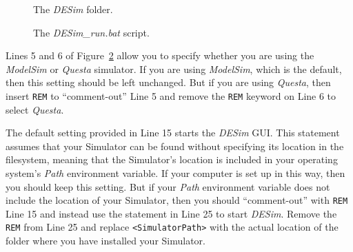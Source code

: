 \documentclass[11pt, twoside, pdftex]{article}
\begin{document}
\begin{figure}[h]
	\begin{center}
        \setlength{\fboxsep}{0pt}
	\end{center}
		  \caption{The {\it DESim} folder.}
	\label{fig:install}
\end{figure}

\begin{figure}[H]
\begin{center}
    \begin{minipage}[t]{16.75 cm}

    \end{minipage}
		  \caption{The {\it DESim\_run.bat} script.}
	\label{fig:bat}
\end{center}
\end{figure}

Lines 5 and 6 of Figure~\ref{fig:bat} allow you to specify whether you are using the
{\it ModelSim} or {\it Questa} simulator. If you are using {\it ModelSim}, which is the
default, then this setting should be left unchanged. But if you are using {\it Questa},
then insert \texttt{REM} to ``comment-out'' Line 5 and remove the \texttt{REM} keyword 
on Line 6 to select {\it Questa}. 

The default setting provided in Line 15 starts the {\it DESim} GUI. This statement assumes
that your Simulator can be found without specifying its location in the filesystem,
meaning that the Simulator's location is included in your operating system's {\it Path}
environment variable.  If your computer is set up in this way, then you should keep this
setting.  But if your {\it Path} environment variable does not include the location of
your Simulator, then you should ``comment-out'' with \texttt{REM} Line 15 and instead use
the statement in Line 25 to start {\it DESim}.  Remove the \texttt{REM} from Line 25 and
replace \texttt{<SimulatorPath>} with the actual location of the folder where you have
installed your Simulator.
\end{document}
